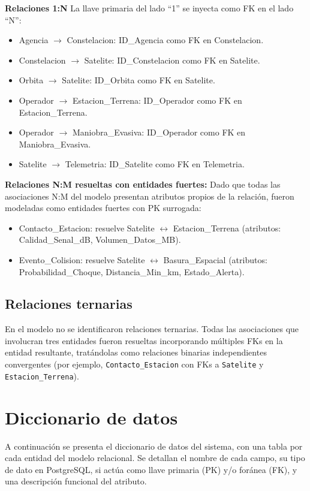 \textbf{Relaciones 1:N} La llave primaria del lado ``1'' se inyecta como FK en el lado ``N'':
\begin{itemize}
    \item Agencia $\rightarrow$ Constelacion: ID\_Agencia como FK en Constelacion.
    \item Constelacion $\rightarrow$ Satelite: ID\_Constelacion como FK en Satelite.
    \item Orbita $\rightarrow$ Satelite: ID\_Orbita como FK en Satelite.
    \item Operador $\rightarrow$ Estacion\_Terrena: ID\_Operador como FK en Estacion\_Terrena.
    \item Operador $\rightarrow$ Maniobra\_Evasiva: ID\_Operador como FK en Maniobra\_Evasiva.
    \item Satelite $\rightarrow$ Telemetria: ID\_Satelite como FK en Telemetria.
\end{itemize}

\textbf{Relaciones N:M resueltas con entidades fuertes:} Dado que todas las asociaciones N:M del modelo presentan atributos propios de la relación, fueron modeladas como entidades fuertes con PK surrogada:
\begin{itemize}
    \item Contacto\_Estacion: resuelve Satelite $\leftrightarrow$ Estacion\_Terrena (atributos: Calidad\_Senal\_dB, Volumen\_Datos\_MB).
    \item Evento\_Colision: resuelve Satelite $\leftrightarrow$ Basura\_Espacial (atributos: Probabilidad\_Choque, Distancia\_Min\_km, Estado\_Alerta).
\end{itemize}

\subsection{Relaciones ternarias}

En el modelo no se identificaron relaciones ternarias. Todas las asociaciones que involucran tres entidades fueron resueltas incorporando múltiples FKs en la entidad resultante, tratándolas como relaciones binarias independientes convergentes (por ejemplo, \texttt{Contacto\_Estacion} con FKs a \texttt{Satelite} y \texttt{Estacion\_Terrena}).

\section{Diccionario de datos}

A continuación se presenta el diccionario de datos del sistema, con una tabla por cada entidad del modelo relacional. Se detallan el nombre de cada campo, su tipo de dato en PostgreSQL, si actúa como llave primaria (PK) y/o foránea (FK), y una descripción funcional del atributo.

